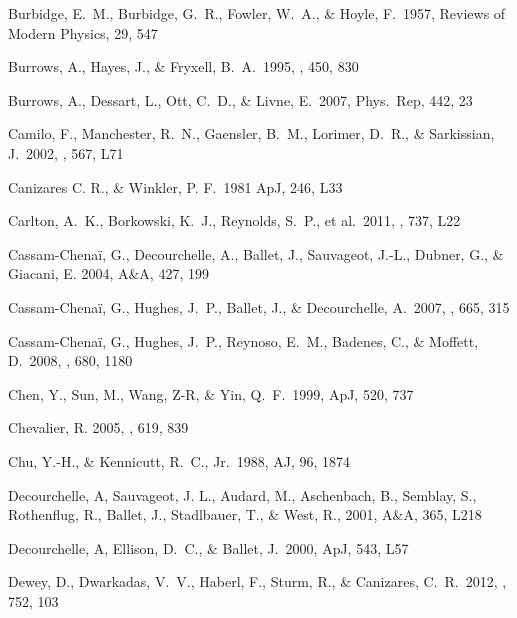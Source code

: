 \documentclass[11pt,a4paper]{article}
\begin{document}
{\begin{multicols}{2}
{\begin{thebibliography}{99}
 Burbidge, E.~M., Burbidge,
  G.~R., Fowler, W.~A., \& Hoyle, F.\ 1957, Reviews of Modern Physics,
  29, 547

Burrows, A.,
  Hayes, J., \& Fryxell, B.~A.\ 1995, \apj, 450, 830

Burrows, A., Dessart, L.,
  Ott, C.~D., \& Livne, E.\ 2007, Phys.~Rep, 442, 23

 Camilo, F., Manchester, R.~N.,
  Gaensler, B.~M., Lorimer, D.~R., \& Sarkissian, J.\ 2002, \apj,
  567, L71

Canizares C. R., \& Winkler, P. F.\ 1981 ApJ, 246, L33 

 Carlton, A.~K., 
Borkowski, K.~J., Reynolds, S.~P., et al.\ 2011,  \apj, 737, L22 

 Cassam-Chena{\"i}, G., Decourchelle, A., Ballet, J., Sauvageot, J.-L., Dubner, G., \& Giacani, E.
 2004, A\&A, 427, 199

  Cassam-Chena{\"i}, G., Hughes, J.~P., Ballet, J., \& Decourchelle,
  A.\ 2007, \apj, 665, 315

Cassam-Chena{\"i}, G., Hughes, J.~P., Reynoso, E.~M., Badenes, C., 
\& Moffett, D.\ 2008, \apj, 680, 1180 

 Chen, Y., Sun, M., Wang, Z-R, \&
  Yin, Q.~F.\ 1999, ApJ, 520, 737
  
Chevalier, R. 2005, \apj, 619, 839


 Chu, Y.-H., \&
  Kennicutt, R.~C., Jr.\ 1988, AJ, 96, 1874

Decourchelle, A, Sauvageot, J. L., Audard, M., Aschenbach, B., Semblay, S.,
Rothenflug, R., Ballet, J., Stadlbauer, T., \& West, R., 2001, A\&A, 365, L218

Decourchelle, A, Ellison, D.~C., \& Ballet, J.\ 2000, ApJ, 543, L57

 Dewey, D., Dwarkadas, 
V.~V., Haberl, F., Sturm, R., \& Canizares, C.~R.\ 2012, \apj, 752, 103 


\end{thebibliography}}
\end{multicols}}
\end{document}
